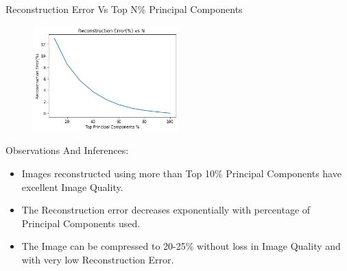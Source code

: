 \documentclass[a4 paper]{article}
\begin{document}
\newpage
{} Reconstruction Error Vs Top N\% Principal Components
\begin{figure}[!htb]
    \centering
        \includegraphics[width=0.5\textwidth]{Reconstruction vs N.png} \\
    
    \label{fig:l}
\end{figure}
 Observations And Inferences:
\begin{itemize}
  \item Images reconstructed using more than Top 10\% Principal Components have excellent Image Quality.
  \item The Reconstruction error decreases exponentially with percentage of Principal Components used. 
  \item The Image can be compressed to 20-25\% without loss in Image Quality and with very low Reconstruction Error.
\end{itemize}




\newpage
{}
\end{document}
